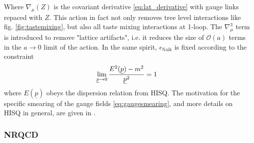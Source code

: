 Where $\nabla_{\mu}(Z)$ is the covariant derivative \eqref{eq:lat_derivative} with gauge links repaced with $Z$. This action in fact not only removes tree level interactions like fig. \ref{fig:tastemixing}, but also all taste mixing interactions at 1-loop. The $\nabla^3_{\mu}$ term is introduced to remove "lattice artifacts", i.e. it reduces the size of $\mathcal{O}(a)$ terms in the $a\to 0$ limit of the action. In the same spirit, $\epsilon_{\text{Naik}}$ is fixed according to the constraint
\begin{align}
	\lim_{\underline{p}\to 0} {E^2(\underline{p})-m^2\over \underline{p}^2} = 1
\end{align}
where $E(\underline{p})$ obeys the dispersion relation from HISQ. The motivation for the specific smearing of the gauge fields \eqref{eq:gaugesmearing}, and more details on HISQ in general, are given in \cite{Follana:2006rc}.

\subsubsection{NRQCD}


